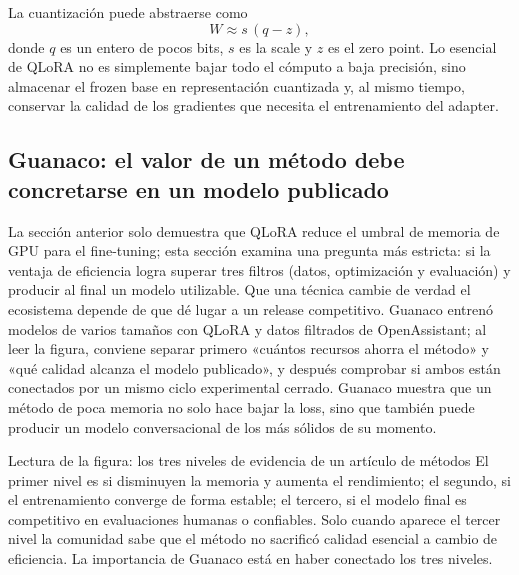 La cuantización puede abstraerse como
\[
W\approx s\,(q-z),
\]
donde $q$ es un entero de pocos bits, $s$ es la scale y $z$ es el zero point. Lo esencial de QLoRA no es simplemente bajar todo el cómputo a baja precisión, sino almacenar el frozen base en representación cuantizada y, al mismo tiempo, conservar la calidad de los gradientes que necesita el entrenamiento del adapter.

\subsection{Guanaco: el valor de un método debe concretarse en un modelo publicado}

La sección anterior solo demuestra que QLoRA reduce el umbral de memoria de GPU para el fine-tuning; esta sección examina una pregunta más estricta: si la ventaja de eficiencia logra superar tres filtros (datos, optimización y evaluación) y producir al final un modelo utilizable. Que una técnica cambie de verdad el ecosistema depende de que dé lugar a un release competitivo. Guanaco entrenó modelos de varios tamaños con QLoRA y datos filtrados de OpenAssistant; al leer la figura, conviene separar primero «cuántos recursos ahorra el método» y «qué calidad alcanza el modelo publicado», y después comprobar si ambos están conectados por un mismo ciclo experimental cerrado. Guanaco muestra que un método de poca memoria no solo hace bajar la loss, sino que también puede producir un modelo conversacional de los más sólidos de su momento.


\begin{knowledgebox}{Lectura de la figura: los tres niveles de evidencia de un artículo de métodos}
El primer nivel es si disminuyen la memoria y aumenta el rendimiento; el segundo, si el entrenamiento converge de forma estable; el tercero, si el modelo final es competitivo en evaluaciones humanas o confiables. Solo cuando aparece el tercer nivel la comunidad sabe que el método no sacrificó calidad esencial a cambio de eficiencia. La importancia de Guanaco está en haber conectado los tres niveles.
\end{knowledgebox}


